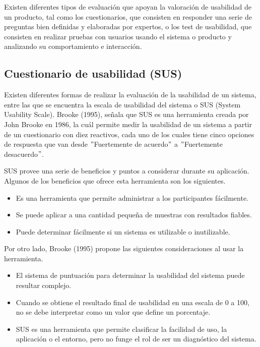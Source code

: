 Existen diferentes tipos de evaluación que apoyan la valoración de usabilidad de un producto, tal como los cuestionarios, que consisten en responder una serie de preguntas bien definidas y elaboradas por expertos, o los test de usabilidad, que consisten en realizar pruebas con usuarios usando el sistema o producto y analizando su comportamiento e interacción.


\subsection{Cuestionario de usabilidad (SUS)}
\label{SUSCap3}

Existen diferentes formas de realizar la evaluación de la usabilidad de un sistema, entre las que se encuentra la escala de usabilidad del sistema o SUS (System Usability Scale). Brooke (1995), señala que SUS es una herramienta creada por John Brooke en 1986, la cuál permite medir la usabilidad de un sistema a partir de un cuestionario con diez reactivos, cada uno de los cuales tiene cinco opciones de respuesta que van desde $"$Fuertemente de acuerdo$"$ a $"$Fuertemente desacuerdo$"$.

SUS provee una serie de beneficios y puntos a considerar durante su aplicación. Algunos de los beneficios que ofrece esta herramienta son los siguientes.

\begin{itemize}
  \item Es una herramienta que permite administrar a los participantes fácilmente.
  \item Se puede aplicar a una cantidad pequeña de muestras con resultados fiables.
  \item Puede determinar fácilmente si un sistema es utilizable o inutilizable.
\end{itemize}

Por otro lado, Brooke (1995) propone las siguientes consideraciones al usar la herramienta.

\begin{itemize}
  \item El sistema de puntuación para determinar la usabilidad del sistema puede resultar complejo.
  \item Cuando se obtiene el resultado final de usabilidad en una escala de 0 a 100, no se debe interpretar como un valor que define un porcentaje.
  \item SUS es una herramienta que permite clasificar la facilidad de uso, la aplicación o el entorno, pero no funge el rol de ser un diagnóstico del sistema.
\end{itemize}

